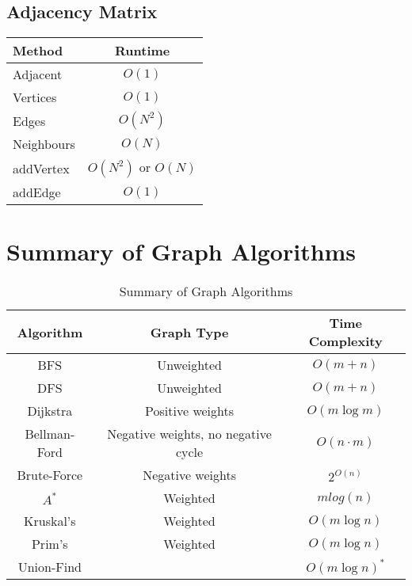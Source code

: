 \documentclass{article}
\begin{document}
\newpage

\subsection{Adjacency Matrix}
\begin{table}[!ht]
\centering
\begin{tabular}{|l|c|}
\hline
\textbf{Method} & \textbf{Runtime} \\
\hline
Adjacent & $O(1)$ \\
\hline
Vertices & $O(1)$ \\
\hline
Edges & $O(N^2)$ \\
\hline
Neighbours & $O(N)$ \\
\hline 
addVertex & $O(N^2)$ or $O(N)$ \\
\hline
addEdge & $O(1)$ \\
\hline
\end{tabular}
\end{table}


\section{Summary of Graph Algorithms}
\begin{table}[h!]
\centering
\begin{tabular}{|c|c|c|}
\hline
\textbf{Algorithm} & \textbf{Graph Type} & \textbf{Time Complexity} \\
\hline
BFS & Unweighted & \( O(m + n) \) \\
\hline
DFS & Unweighted & \( O(m + n) \)\\
\hline
Dijkstra & Positive weights & \( O(m \log m) \) \\
\hline
Bellman-Ford & Negative weights, no negative cycle & \( O(n \cdot m) \) \\
\hline
Brute-Force & Negative weights & \( 2^{O(n)} \) \\
\hline
$A^*$ &Weighted& $mlog( n )$ \\
\hline
Kruskal's &Weighted& \( O(m \log n) \) \\
\hline
Prim's  &Weighted& \( O(m \log n) \) \\
\hline
Union-Find  && \( O(m \log n)^* \) \\
\hline
\end{tabular}
\caption{Summary of Graph Algorithms}
\end{table}
\end{document}
